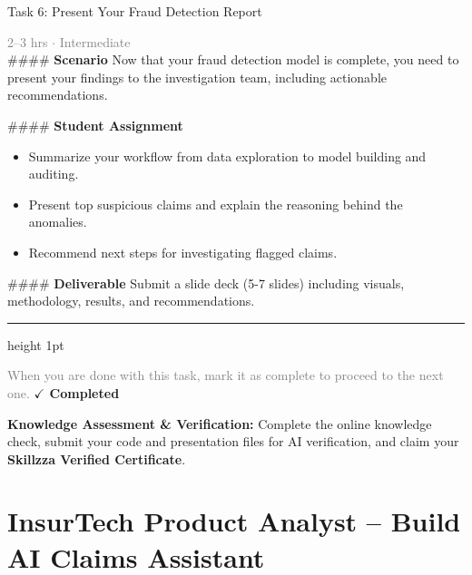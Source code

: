 \documentclass[10pt,a4paper]{article}
\begin{document}
\begin{taskbox}{Task 6: Present Your Fraud Detection Report}

    {\small \textcolor{gray}{2--3 hrs $\cdot$ Intermediate}}\\[12pt]

    \#\#\#\# \textbf{Scenario}  
Now that your fraud detection model is complete, you need to present your findings to the investigation team, including actionable recommendations.  

\#\#\#\# \textbf{Student Assignment}  
\begin{itemize}
    \item Summarize your workflow from data exploration to model building and auditing.  
    \item Present top suspicious claims and explain the reasoning behind the anomalies.  
    \item Recommend next steps for investigating flagged claims.  
\end{itemize}

\#\#\#\# \textbf{Deliverable}  
Submit a slide deck (5-7 slides) including visuals, methodology, results, and recommendations.\par

    \vspace{16pt}

    \textcolor{cardBorder}{\hrule height 1pt}\vspace{8pt}

    \small \textcolor{gray}{When you are done with this task, mark it as complete to proceed to the next one.} \hfill \textbf{\textcolor{brandDark}{$\checkmark$ Completed}}

\end{taskbox}

\begin{completionbox}
    \textbf{Knowledge Assessment \& Verification:} Complete the online knowledge check, submit your code and presentation files for AI verification, and claim your \textbf{Skillzza Verified Certificate}.
\end{completionbox}

\newpage




\section*{InsurTech Product Analyst – Build AI Claims Assistant}
\end{document}
